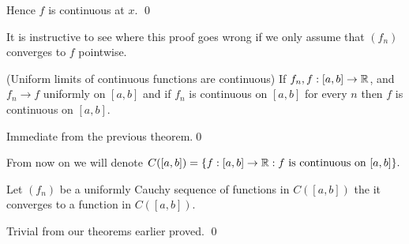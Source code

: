\documentclass{article}
\begin{document}
Hence $ f $ is continuous at $ x $. \qed\par
It is instructive to see where this proof goes wrong if we only assume that $ (f_n) $ converges to $ f $ pointwise.
\begin{corollary}
	(Uniform limits of continuous functions are continuous) If $ f_n,f:[a,b]\to \mathbb{R} $, and $ f_n\to f $ uniformly on $ [a,b] $ and if $ f_n $ is continuous on $ [a,b] $ for every $ n $ then $ f $ is continuous on $ [a,b] $.
\end{corollary}
\pf Immediate from the previous theorem.\qed\par
From now on we will denote $ C([a,b]) = \{f:[a,b]\to \mathbb{R}:f\text{ is continuous on } [a,b]\}. $
\begin{theorem}
	Let $ (f_n) $ be a uniformly Cauchy sequence of functions in $ C([a,b]) $ the it converges to a function in $ C([a,b]) $.
\end{theorem}
\pf Trivial from our theorems earlier proved. \qed
\end{document}
